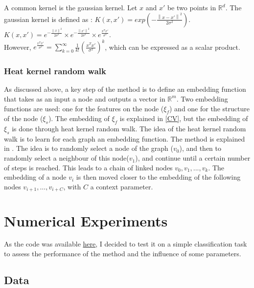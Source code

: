 \documentclass[a4paper,11pt]{article}
\begin{document}
A common kernel is the gaussian kernel. 
Let $x$ and $x'$ be two points in $\mathbb{R}^d$.
The gaussian kernel is defined as : $K(x, x') = exp(-\frac{\left\lVert x - x' \right\rVert ^2}{2\sigma^2})$.\\
$K(x, x') = e^{-\frac{\left\lVert x \right\rVert ^2}{2\sigma^2}} \times e^{-\frac{\left\lVert x' \right\rVert ^2}{2\sigma^2}} \times e^{ \frac{x^T x'}{\sigma^2}}$.\\
However, $e^{\frac{x^T x'}{\sigma^2}} = \sum_{k=0}^{\infty} \frac{1}{k!} \left( \frac{x^T x'}{\sigma^2} \right)^k$, which can be expressed as a scalar product. \\


\subsubsection{Heat kernel random walk}

As discussed above, a key step of the method is to define an embedding function that takes as an input a node and outputs a vector in $\mathbb{R}^m$.
Two embedding functions are used: one for the features on the node ($\xi_f$) and one for the structure of the node ($\xi_s$).
The embedding of $\xi_f$ is explained in \ref{CV}, but the embedding of $\xi_s$ is done through heat kernel random walk.
The idea of the heat kernel random walk is to learn for each graph an embedding function. 
The method is explained in \cite{abu2018watch}. 
The idea is to randomly select a node of the graph ($v_0$), and then to randomly select a neighbour of this node($v_1$), and continue until a certain number of steps is reached.
This leads to a chain of linked nodes $v_0, v_1, ..., v_k$.
The embedding of a node $v_i$ is then moved closer to the embedding of the following nodes $ v_{i+1}, \dots, v_{i+C} $, with $C$ a context parameter. 


\section{Numerical Experiments}

As the code was available \href{https://github.com/wokas36/RWK}{here}, I decided to test it on a simple classification task to assess the performance of the method and the influence of some parameters. 

\subsection{Data}
\end{document}
